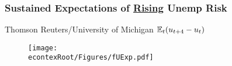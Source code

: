   \begin{frame}
    \frametitle{\textbf{Sustained Expectations of \underline{Rising} Unemp Risk}}
    Thomson Reuters/University of Michigan $\mathbb{E}_{t}(u_{t+4}-u_{t})$

    \begin{figure}
      \texttt{[image: \\econtexRoot/Figures/fUExp.pdf]}
    \end{figure}
  \end{frame}
